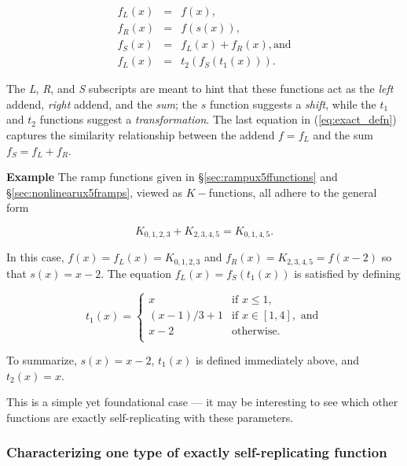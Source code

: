 \documentclass[]{article}
\begin{document}
\begin{equation}\begin{array}{rcl}
  f_L(x) & = & f(x), \\
  f_R(x) & = & f(s(x)), \\
  f_S(x) & = & f_L(x) + f_R(x), \text{and} \\
  f_L(x) & = & t_2(f_S(t_1(x))).
\end{array}\label{eq:exact_defn}\end{equation}

The \emph{L}, \emph{R}, and \emph{S} subscripts are meant to hint that
these functions act as the \emph{left} addend, \emph{right} addend, and
the \emph{sum}; the \(s\) function suggests a \emph{shift}, while the
\(t_1\) and \(t_2\) functions suggest a \emph{transformation}. The last
equation in (\ref{eq:exact_defn}) captures the similarity relationship
between the addend \(f = f_L\) and the sum \(f_S = f_L + f_R\).

\textbf{Example} The ramp functions given in
§\ref{sec:rampux5ffunctions} and §\ref{sec:nonlinearux5framps}, viewed
as \(K-\)functions, all adhere to the general form

\[K_{0,1,2,3} + K_{2,3,4,5} = K_{0,1,4,5}.\]

In this case, \(f(x) = f_L(x) = K_{0,1,2,3}\) and
\(f_R(x) = K_{2,3,4,5} = f(x-2)\) so that \(s(x) = x - 2\). The equation
\(f_L(x) = f_S(t_1(x))\) is satisfied by defining

\[t_1(x) =
\begin{cases}
  x              &   \text{if } x \le 1,                  \\
  (x - 1)/3 + 1  &   \text{if } x \in [1,4], \text{ and}  \\
  x - 2          &   \text{otherwise.}                    \\
\end{cases}\]

To summarize, \(s(x) = x - 2\), \(t_1(x)\) is defined immediately above,
and \(t_2(x) = x\).

This is a simple yet foundational case --- it may be interesting to see
which other functions are exactly self-replicating with these
parameters.

\subsubsection{Characterizing one type of exactly self-replicating
function}\label{characterizing-one-type-of-exactly-self-replicating-function}
\end{document}
